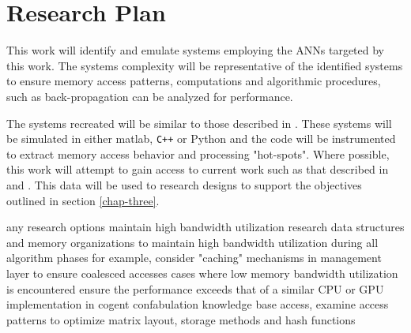 
\chapter{Research Plan}
\label{chap-six}

This work will identify and emulate systems employing the ANNs targeted by this work. The systems complexity will be representative of the identified systems
to ensure memory access patterns, computations and algorithmic procedures, such as back-propagation can be analyzed for performance.

The systems recreated will be similar to those described in \cite{krizhevsky2012imagenet}\cite{qiu2013parallel}\cite{mnih2013playing}.
These systems will be simulated in either matlab, \verb!C++! or Python and the code will be instrumented to extract memory access behavior and
processing "hot-spots".
Where possible, this work will attempt to gain access to current work such as that described in \cite{qiu2013parallel} and \cite{tensorflow2015-whitepaper}.
This data will be used to research designs to support the objectives outlined in section \ref{chap-three}.


\begin{outline}
\renewcommand{\outlinei}{enumerate}
  \vspace{-3mm}
  \1 any research options maintain high bandwidth utilization
    \vspace{-3mm}
    \2 research data structures and memory organizations to maintain high bandwidth utilization during all algorithm phases
      \3 for example, consider "caching" mechanisms in management layer to ensure coalesced accesses
  \vspace{-3mm}
  \1 cases where low memory bandwidth utilization is encountered ensure the performance
        exceeds that of a similar CPU or GPU implementation
    \vspace{-3mm}
    \2 in cogent confabulation knowledge base access, examine access patterns to optimize matrix layout, storage methods and hash functions
\end{outline}

